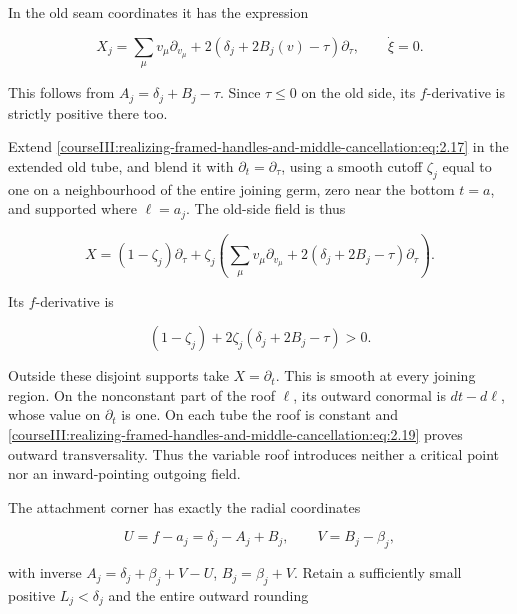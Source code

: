 In the old seam coordinates it has the expression

\begin{equation}
X_j=
 \sum_\mu v_\mu\partial_{v_\mu}
       +2(\delta_j+2B_j(v)-\tau)\partial_\tau,
 \qquad \dot\xi=0 .
 \label{courseIII:realizing-framed-handles-and-middle-cancellation:eq:2.17}
\end{equation}

This follows from \(A_j=\delta_j+B_j-\tau\). Since \(\tau\leq0\) on the old side, its \(f\)-derivative is strictly positive there too.

Extend \eqref{courseIII:realizing-framed-handles-and-middle-cancellation:eq:2.17} in the extended old tube, and blend it with \(\partial_t=\partial_\tau\), using a smooth cutoff \(\zeta_j\) equal to one on a neighbourhood of the entire joining germ, zero near the bottom \(t=a\), and supported where \(\ell=a_j\). The old-side field is thus

\begin{equation}
X=(1-\zeta_j)\partial_\tau+\zeta_j
 \left(\sum_\mu v_\mu\partial_{v_\mu}
       +2(\delta_j+2B_j-\tau)\partial_\tau\right).
 \label{courseIII:realizing-framed-handles-and-middle-cancellation:eq:2.18}
\end{equation}

Its \(f\)-derivative is

\begin{equation}
(1-\zeta_j)+2\zeta_j(\delta_j+2B_j-\tau)>0.
 \label{courseIII:realizing-framed-handles-and-middle-cancellation:eq:2.19}
\end{equation}

Outside these disjoint supports take \(X=\partial_t\). This is smooth at every joining region. On the nonconstant part of the roof \(\ell\), its outward conormal is \(dt-d\ell\), whose value on \(\partial_t\) is one. On each tube the roof is constant and \eqref{courseIII:realizing-framed-handles-and-middle-cancellation:eq:2.19} proves outward transversality. Thus the variable roof introduces neither a critical point nor an inward-pointing outgoing field.

The attachment corner has exactly the radial coordinates

\begin{equation}
U=f-a_j=\delta_j-A_j+B_j,\qquad V=B_j-\beta_j,
 \label{courseIII:realizing-framed-handles-and-middle-cancellation:eq:2.20}
\end{equation}

with inverse \(A_j=\delta_j+\beta_j+V-U\), \(B_j=\beta_j+V\). Retain a sufficiently small positive \(L_j<\delta_j\) and the entire outward rounding

